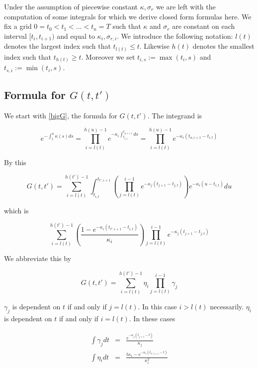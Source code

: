 \documentclass{amsart}
\theoremstyle{plain}
\numberwithin{equation}{section}
\begin{document}
Under the assumption of piecewise constant $\kappa, \sigma_r$ we are left with the computation of some integrals for which we derive
closed form formulas here. We fix a grid $0=t_0 < t_1 < ... < t_n =T$ such that $\kappa$ and $\sigma_r$ are constant on each interval $[t_i,t_{i+1})$ and equal to $\kappa_i, \sigma_{r,i}$. We introduce the following notation: $l(t)$ denotes the largest index such that $t_{l(t)} \leq t$. Likewise $h(t)$ denotes the smallest index such that $t_{h(t)}\geq t$. Moreover we set $t_{i,s} := \max( t_i, s )$ and $t_{s,i} := \min( t_i, s)$.

\subsection{Formula for $G(t,t')$}

We start with \ref{bigG}, the formula for $G(t,t')$. The integrand is

\begin{equation}
e^{-\int_t^u \kappa(s) ds} = \prod_{i=l(t)}^{h(u)-1} e^{-\kappa_i\int_{t_{i,t}}^{t_{u,i+1}} ds } = \prod_{i=l(t)}^{h(u)-1} e^{-\kappa_i(t_{u,i+1}-t_{i,t})}
\end{equation}

By this

\begin{equation}
G(t,t') = \sum_{i=l(t)}^{h(t')-1} \int_{t_{i,t}}^{t_{t',i+1}} \left( \prod_{j=l(t)}^{i-1} e^{-\kappa_j(t_{j+1}-t_{j,t})} \right) e^{-\kappa_i(u-t_{i,t})} du
\end{equation}

which is

\begin{equation}
\sum_{i=l(t)}^{h(t')-1} \left( \frac{1- e^{-\kappa_i(t_{t',i+1}-t_{i,t})}}{\kappa_i} \right) \prod_{j=l(t)}^{i-1} e^{-\kappa_j(t_{j+1}-t_{j,t})} 
\end{equation}

We abbreviate this by

\begin{equation}
G(t,t') = \sum_{i=l(t)}^{h(t')-1} \eta_i \prod_{j=l(t)}^{i-1} \gamma_{j} 
\end{equation}

$\gamma_j$ is dependent on $t$ if and only if $j=l(t)$. In this case $i>l(t)$ necessarily. $\eta_i$ is dependent on $t$ if and only if $i=l(t)$. In these cases

\begin{eqnarray}
\int \gamma_{j} dt &=& \frac{e^{-\kappa_j(t_{j+1}-t)}}{\kappa_j} \\
\int \eta_i dt &=& \frac{t\kappa_i-e^{-\kappa_i(t_{t',i+1}-t)}}{\kappa_i^2}
\end{eqnarray} 
\end{document}
